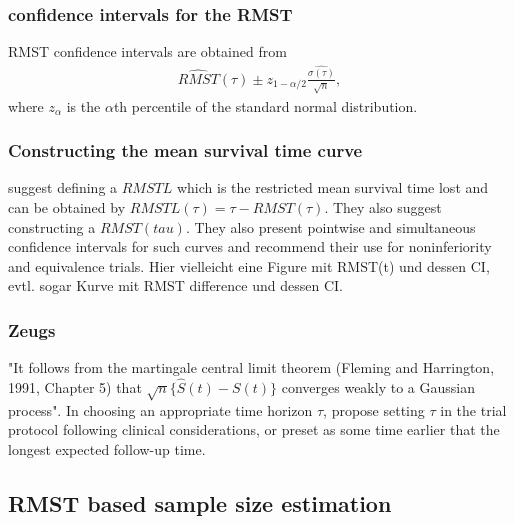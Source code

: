 \documentclass[main.tex]{subfiles}
\begin{document}
\subsubsection{confidence intervals for the RMST}
RMST confidence intervals are obtained from
\begin{align}
\hat{RMST}(\tau) \pm z_{1-\alpha/2}\frac{\hat{\sigma(\tau)}}{\sqrt{n}},
\end{align}
where $z_{\alpha}$ is the $\alpha$th percentile of the standard normal distribution.

\subsubsection{Constructing the mean survival time curve}
\textcite{Zhao2016-nr} suggest defining a $RMSTL$ which is the restricted mean survival time lost and can be obtained by $RMSTL(\tau) = \tau - RMST(\tau)$. They also suggest constructing a $RMST(tau)$. They also present pointwise and simultaneous confidence intervals for such curves and recommend their use for noninferiority and equivalence trials.
 Hier vielleicht eine Figure mit RMST(t) und dessen CI, evtl. sogar Kurve mit RMST difference und dessen CI.


\subsubsection{Zeugs}
\parencite{Zhao2016-nr} "It follows from the martingale central limit theorem (Fleming and Harrington, 1991, Chapter 5) that $\sqrt{n}\{\hat{S}(t) - S(t)\}$ converges weakly to a Gaussian process".
In choosing an appropriate time horizon $\tau$, \textcite{Royston2011-bd} propose setting $\tau$ in the trial protocol following clinical considerations, or preset as some time earlier that the longest expected follow-up time. 
\subsection{RMST based sample size estimation}
\end{document}
